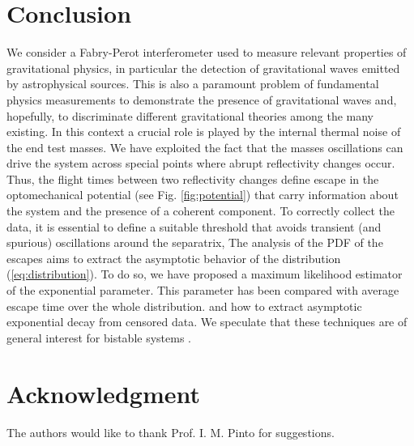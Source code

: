 \documentclass[conference]{IEEEtran}
\begin{document}
 

\section{Conclusion}

We consider a Fabry-Perot interferometer used to measure relevant properties of gravitational physics, in particular the detection of gravitational waves emitted by astrophysical sources. 
This is also a paramount problem of  fundamental physics measurements to demonstrate the presence of gravitational waves and, hopefully, to discriminate different gravitational theories among the many existing.
In this context a crucial role is played by the internal thermal noise of the end test masses. 
We have exploited the fact that the masses oscillations can drive the system across special points where abrupt reflectivity changes occur. 
Thus, the flight times between two reflectivity changes define escape  in the optomechanical potential (see Fig. \ref{fig:potential}) that carry information about the system and the presence of a coherent component.
To correctly collect the data, it is essential to define a suitable threshold that avoids transient (and spurious) oscillations around the separatrix, 
The analysis of the PDF of the escapes aims to extract the asymptotic behavior of the distribution (\ref{eq:distribution}). 
To do so, we have proposed a maximum likelihood estimator of the exponential parameter. 
This parameter has been compared with average escape time over the whole distribution.
and how to extract asymptotic exponential decay from censored data. 
We speculate that these techniques are of general interest for bistable systems \cite{Addesso15b}.



\section*{Acknowledgment}


The authors would like to thank Prof. I. M. Pinto for suggestions.
\end{document}
